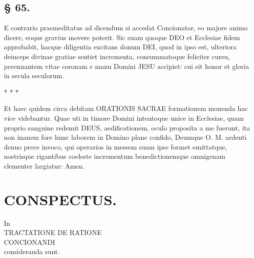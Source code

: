 \subsection*{§ 65.}

E contrario praemeditatus ad dicendum si accedat Concionator, eo majore animo dicere, eoque gravius movere poterit. Sic suam quoque DEO et Ecclesiae fidem approbabit, hacque diligentia excitans donum DEI, quod in ipso est, ulteriora deinceps divinae gratiae sentiet incrementa, consummatoque feliciter cursu, perennantem vitae coronam e manu Domini JESU accipiet: cui sit honor et gloria in secula seculorum.

* * *

Et haec quidem circa debitam ORATIONIS SACRAE formationem monenda hac vice videbantur. Quae uti in timore Domini intentoque unice in Ecclesiae, quam proprio sanguine redemit DEUS, aedificationem, oculo proposita a me fuerunt, ita non inanem fore hunc laborem in Domino plane confido, Deumque O. M. ardenti denuo prece invoco, qui operarios in messem suam ipse formet emittatque, nostrisque rigantibus coeleste incrementum benedictionemque omnigenam clementer largiatur: Amen.

\section*{CONSPECTUS.}

\begin{center}
In\\
TRACTATIONE DE RATIONE\\
CONCIONANDI\\
consideranda sunt.
\end{center}

